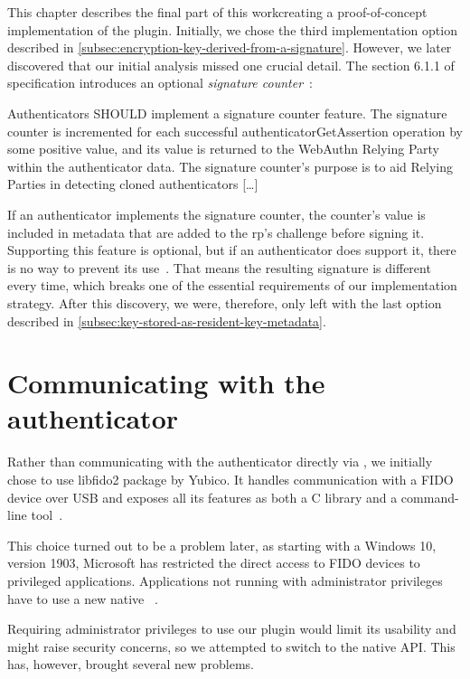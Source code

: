 This chapter describes the final part of this work\textemdash creating a proof-of-concept implementation of the plugin.
Initially, we chose the third implementation option described in \autoref{subsec:encryption-key-derived-from-a-signature}.
However, we later discovered that our initial analysis missed one crucial detail. The section 6.1.1 of  specification
introduces an optional \emph{signature counter}~\cite{fido:webautn}:

\begin{quoting}
	Authenticators SHOULD implement a signature counter feature. The signature counter is incremented
	for each successful authenticatorGetAssertion operation by some positive value, and its value is returned
	to the WebAuthn Relying Party within the authenticator data. The signature counter's purpose is to aid Relying Parties
	in detecting cloned authenticators [\ldots]
\end{quoting}

If an authenticator implements the signature counter, the counter's value is included in metadata that are added
to the \gls{rp}'s challenge before signing it. Supporting this feature is optional, but if an authenticator does support it,
there is no way to prevent its use~\cite{fido:webautn}. That means the resulting signature is different every time, which
breaks one of the essential requirements of our implementation strategy. After this discovery, we were, therefore,
only left with the last option described in \autoref{subsec:key-stored-as-resident-key-metadata}.

\section{Communicating with the authenticator}\label{sec:communicating-with-the-authenticator}

Rather than communicating with the authenticator directly via ,
we initially chose to use libfido2 package by Yubico. It handles communication with
a FIDO device over USB and exposes all its features as both a C library
and a command-line tool~\cite{libfido2}.

This choice turned out to be a problem later, as starting with a Windows 10, version 1903,
Microsoft has restricted the direct access to FIDO devices to privileged applications. Applications not running
with administrator privileges have to use a new native ~\cite{libfido2}.

Requiring administrator privileges to use our plugin would limit its usability and might raise security concerns,
so we attempted to switch to the native API. This has, however, brought several new problems.

